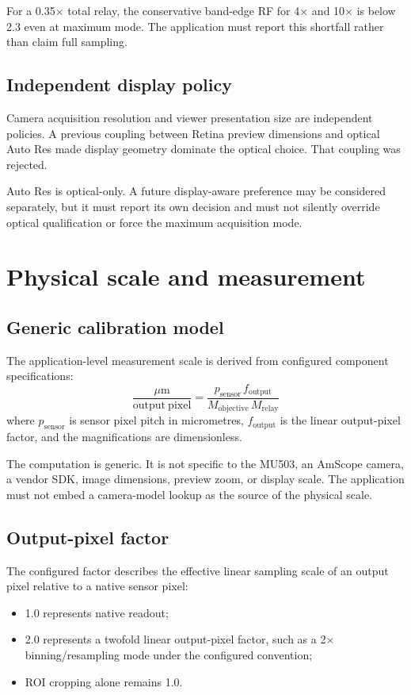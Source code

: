 \documentclass[11pt,a4paper,oneside]{article}
\begin{document}
For a 0.35$\times$ total relay, the conservative band-edge RF for 4$\times$ and 10$\times$ is below 2.3 even at maximum mode. The application must report this shortfall rather than claim full sampling.

\subsection{Independent display policy}
Camera acquisition resolution and viewer presentation size are independent policies. A previous coupling between Retina preview dimensions and optical Auto Res made display geometry dominate the optical choice. That coupling was rejected.

Auto Res is optical-only. A future display-aware preference may be considered separately, but it must report its own decision and must not silently override optical qualification or force the maximum acquisition mode.

\section{Physical scale and measurement}

\subsection{Generic calibration model}
The application-level measurement scale is derived from configured component specifications:
\begin{equation}
\boxed{
\frac{\mu\mathrm{m}}{\mathrm{output\ pixel}} =
\frac{
p_{\mathrm{sensor}}\, f_{\mathrm{output}}
}{
M_{\mathrm{objective}}\,M_{\mathrm{relay}}
}}
\end{equation}
where $p_{\mathrm{sensor}}$ is sensor pixel pitch in micrometres, $f_{\mathrm{output}}$ is the linear output-pixel factor, and the magnifications are dimensionless.

The computation is generic. It is not specific to the MU503, an AmScope camera, a vendor SDK, image dimensions, preview zoom, or display scale. The application must not embed a camera-model lookup as the source of the physical scale.

\subsection{Output-pixel factor}
The configured factor describes the effective linear sampling scale of an output pixel relative to a native sensor pixel:
\begin{itemize}
  \item 1.0 represents native readout;
  \item 2.0 represents a twofold linear output-pixel factor, such as a 2$\times$ binning/resampling mode under the configured convention;
  \item ROI cropping alone remains 1.0.
\end{itemize}
\end{document}
